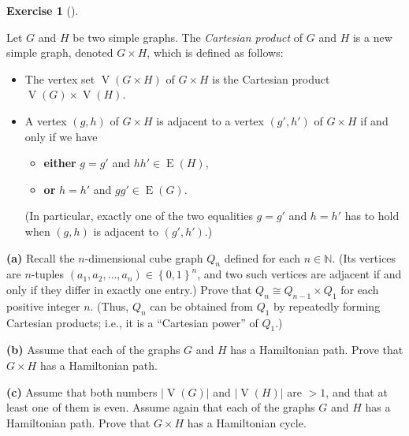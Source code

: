\documentclass[numbers=enddot,12pt,final,onecolumn,notitlepage]{scrartcl}%
\newcounter{exer}
\theoremstyle{definition}
\newtheorem{exmp}[exer]{Exercise}
\newenvironment{exercise}[1][]
{\begin{exmp}[#1]\begin{leftbar}}
{\end{leftbar}\end{exmp}}
\newcommand{\NN}{\mathbb{N}}
\newcommand{\set}[1]{\left\{ #1 \right\}}
\newcommand{\abs}[1]{\left| #1 \right|}
\newcommand{\tup}[1]{\left( #1 \right)}
\newcommand{\verts}[1]{\operatorname{V}\left( #1 \right)}
\newcommand{\edges}[1]{\operatorname{E}\left( #1 \right)}
\begin{document}
\begin{exercise} \label{exe.hw2.hamilGxH}
Let $G$ and $H$ be two simple graphs. The \textit{Cartesian product} of $G$
and $H$ is a new simple graph, denoted $G \times H$, which is defined as
follows:
\begin{itemize}
\item The vertex set $\verts{G \times H}$ of $G \times H$ is the
Cartesian product $\verts{G} \times \verts{H}$.

\item A vertex $\tup{g, h}$ of $G \times H$ is adjacent to a vertex
$\tup{g', h'}$ of $G \times H$ if and only if we have
\begin{itemize}
\item \textbf{either} $g = g'$ and $hh' \in \edges{H}$,
\item \textbf{or} $h = h'$ and $gg' \in \edges{G}$.
\end{itemize}
(In particular, exactly one of the two equalities $g = g'$ and $h = h'$
has to hold when $\tup{g, h}$ is adjacent to $\tup{g', h'}$.)
\end{itemize}

\textbf{(a)} Recall the $n$-dimensional cube graph $Q_n$ defined for
each $n \in \NN$. (Its vertices are $n$-tuples $\tup{a_1, a_2, \ldots,
a_n} \in \set{0, 1}^n$, and two such vertices are adjacent if and only
if they differ in exactly one entry.) Prove that $Q_n \cong
Q_{n-1} \times Q_1$ for each positive integer $n$. (Thus, $Q_n$ can
be obtained from $Q_1$ by repeatedly forming Cartesian products; i.e.,
it is a ``Cartesian power'' of $Q_1$.)

\textbf{(b)} Assume that each of the graphs $G$ and $H$ has a
Hamiltonian path. Prove that $G \times H$ has a Hamiltonian path.

\textbf{(c)} Assume that both numbers $\abs{\verts{G}}$ and
$\abs{\verts{H}}$ are $> 1$, and that at least one of them is even.
Assume again that each of the graphs $G$ and $H$ has a Hamiltonian
path. Prove that $G \times H$ has a Hamiltonian cycle.

\end{exercise}
\end{document}
